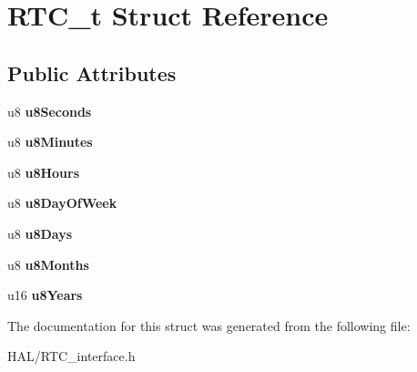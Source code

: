 \hypertarget{struct_r_t_c__t}{}\section{R\+T\+C\+\_\+t Struct Reference}
\label{struct_r_t_c__t}
\subsection*{Public Attributes}
\begin{DoxyCompactItemize}
\item 
\mbox{\label{struct_r_t_c__t_aa8db0869ae07e799f892e25881f03869}} 
u8 {\bfseries u8\+Seconds}
\item 
\mbox{\label{struct_r_t_c__t_aad35caaeb1a8054732d107c1833f9ee9}} 
u8 {\bfseries u8\+Minutes}
\item 
\mbox{\label{struct_r_t_c__t_a9333cc40fe12f03654c5aaab3f19fb50}} 
u8 {\bfseries u8\+Hours}
\item 
\mbox{\label{struct_r_t_c__t_a2b0765e339c15ea450cf69147e6fc900}} 
u8 {\bfseries u8\+Day\+Of\+Week}
\item 
\mbox{\label{struct_r_t_c__t_a99dc076a95f8d41e47e513b51646d306}} 
u8 {\bfseries u8\+Days}
\item 
\mbox{\label{struct_r_t_c__t_a4408813e8c1f12a27b45ebf0a2765434}} 
u8 {\bfseries u8\+Months}
\item 
\mbox{\label{struct_r_t_c__t_af2134fe0b006c36a0f5febece8cc7142}} 
u16 {\bfseries u8\+Years}
\end{DoxyCompactItemize}


The documentation for this struct was generated from the following file\+:\begin{DoxyCompactItemize}
\item 
H\+A\+L/R\+T\+C\+\_\+interface.\+h\end{DoxyCompactItemize}
